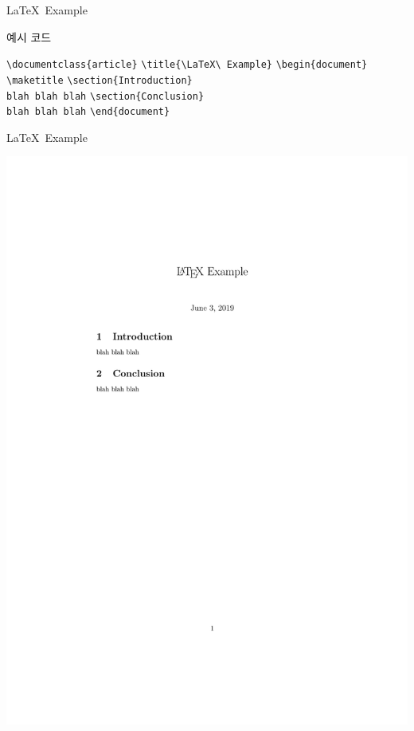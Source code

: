 \documentclass[12pt]{gshs_lecture}
\newenvironment{codeblock}[1]{
	\begin{block}{#1}
		\setstretch{1.0}
		\begin{small}
}{
		\end{small}
	\end{block}
}
\begin{document}
\begin{frame}[t]{\LaTeX\ Example}
	\begin{codeblock}{예시 코드}
		\texttt{\textbackslash documentclass\{article\}}
		\vskip 1pc
		\texttt{\textbackslash title\{\textbackslash LaTeX\textbackslash\ Example\}}
		\vskip 1pc
		\texttt{\textbackslash begin\{document\}}
		\vskip 1pc
		\texttt{\textbackslash maketitle}
		\vskip 1pc	
		\texttt{\textbackslash section\{Introduction\}} \\
		\hspace{6mm} \texttt{blah blah blah}
		\vskip 1pc	
		\texttt{\textbackslash section\{Conclusion\}} \\
		\hspace{6mm} \texttt{blah blah blah}
		\vskip 1pc
		\texttt{\textbackslash end\{document\}}
		
	\end{codeblock}
\end{frame}

\begin{frame}[t]{\LaTeX\ Example}
	\begin{framed}
		\includegraphics[width=\textwidth,trim={3cm 16.5cm 3cm 4.5cm},clip]{./pdfs/ex1.pdf}
	\end{framed}
\end{frame}
\end{document}
